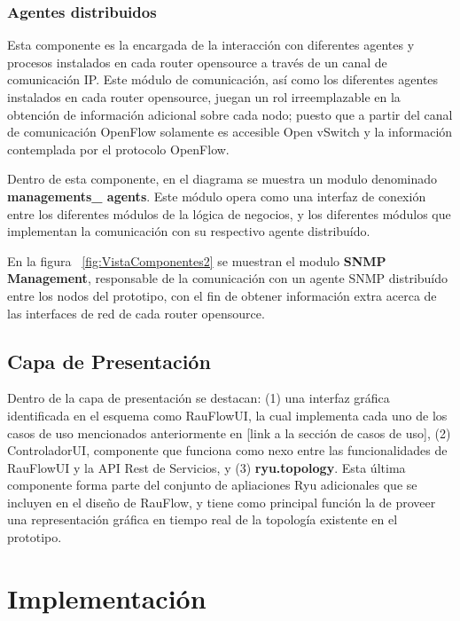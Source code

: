 \subsubsection{Agentes distribuidos}
Esta componente es la encargada de la interacci\'on con diferentes agentes y procesos instalados en cada router opensource a través de un canal de comunicación IP. Este m\'odulo de comunicaci\'on, as\'i como los diferentes agentes instalados en cada router opensource, juegan un rol irreemplazable en la obtenci\'on de informaci\'on adicional sobre cada nodo; puesto que a partir del canal de comunicaci\'on OpenFlow solamente es accesible Open vSwitch y la informaci\'on contemplada por el protocolo OpenFlow.

Dentro de esta componente, en el diagrama se muestra un modulo denominado \textbf{managements\_ agents}. Este m\'odulo opera como una interfaz de conexi\'on entre los diferentes m\'odulos de la l\'ogica de negocios, y los diferentes m\'odulos que implementan la comunicaci\'on con su respectivo agente distribu\'ido.

En la figura ~\ref{fig:VistaComponentes2} se muestran el modulo \textbf{SNMP Management}, responsable de  la comunicaci\'on con un agente SNMP distribu\'ido entre los nodos del prototipo, con el fin de obtener informaci\'on extra acerca de las interfaces de red de cada router opensource.\\

\subsection{Capa de Presentación}
Dentro de la capa de presentaci\'on se destacan: (1) una interfaz gr\'afica identificada en el esquema como RauFlowUI, la cual implementa cada uno de los casos de uso mencionados anteriormente en [link a la secci\'on de casos de uso], (2) ControladorUI, componente que funciona como nexo entre las funcionalidades de RauFlowUI y la API Rest de Servicios, y (3) \textbf{ryu.topology}. Esta \'ultima componente forma parte del conjunto de apliaciones Ryu adicionales que se incluyen en el dise\~no de RauFlow, y tiene como principal funci\'on la de proveer una representaci\'on gr\'afica en tiempo real de la topolog\'ia existente en el prototipo.\\

\section[Implementaci\'on]{Implementaci\'on}

